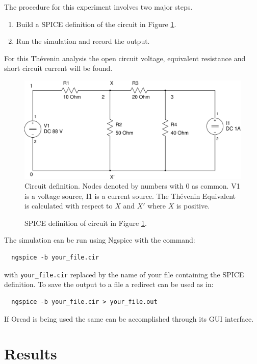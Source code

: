 \documentclass{article}
\begin{document}
The procedure for this experiment involves two major steps.
\begin{enumerate}
\item Build a SPICE definition of the circuit in Figure \ref{fig:circuit}.
\item Run the simulation and record the output.
\end{enumerate}
For this Th\'{e}venin analysis the open circuit voltage, equivalent
resistance and short circuit current will be found.

\begin{figure}[!hbtp]
\center
\includegraphics[scale=0.5]{spice/circuit}
\caption{Circuit definition.
Nodes denoted by numbers with 0 as common.
V1 is a voltage source, I1 is a current source.
The Th\'{e}venin Equivalent is calculated with respect to $X$ and $X'$ where
$X$ is positive.
}
\label{fig:circuit}
\end{figure}

\begin{figure}[!hbtp]

\caption{SPICE definition of circuit in Figure \ref{fig:circuit}.}
\end{figure}

The simulation can be run using Ngspice with the command:
\begin{verbatim}
  ngspice -b your_file.cir
\end{verbatim}
with \verb+your_file.cir+ replaced by the name of your file
containing the SPICE definition.
To save the output to a file a redirect can be used as
in:
\begin{verbatim}
  ngspice -b your_file.cir > your_file.out
\end{verbatim}
If Orcad is being used the same can be accomplished through
its GUI interface.

\clearpage

\section{Results}
\end{document}

